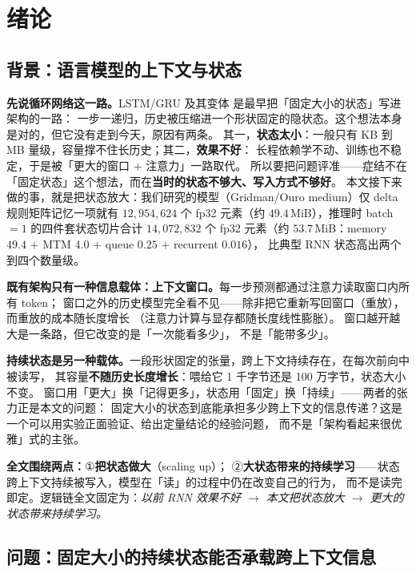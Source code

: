 \section{绪论}\label{sec:intro}

\subsection{背景：语言模型的上下文与状态}\label{sec:bg}

\textbf{先说循环网络这一路。}LSTM/GRU 及其变体\citep{hochreiter1997lstm,cho2014gru}
是最早把「固定大小的状态」写进架构的一路：
一步一递归，历史被压缩进一个形状固定的隐状态。这个想法本身是对的，但它没有走到今天，原因有两条。
其一，\textbf{状态太小}：一般只有 KB 到 MB 量级，容量撑不住长历史；其二，\textbf{效果不好}：
长程依赖学不动、训练也不稳定，于是被「更大的窗口 + 注意力」一路取代。
所以要把问题评准——症结不在「固定状态」这个想法，而在\textbf{当时的状态不够大、写入方式不够好}。
本文接下来做的事，就是把状态放大：我们研究的模型（Gridman/Ouro medium）仅 delta 规则矩阵记忆一项就有
$12{,}954{,}624$ 个 fp32 元素（约 $49.4$\,MiB），推理时 batch$=1$ 的四件套状态切片合计
$14{,}072{,}832$ 个 fp32 元素（约 $53.7$\,MiB：memory $49.4$ $+$ MTM $4.0$ $+$ queue $0.25$ $+$ recurrent $0.016$），
比典型 RNN 状态高出两个到四个数量级。

\textbf{既有架构只有一种信息载体：上下文窗口。}每一步预测都通过注意力读取窗口内所有 token；
窗口之外的历史模型完全看不见——除非把它重新写回窗口（重放），而重放的成本随长度增长
（注意力计算与显存都随长度线性膨胀）\citep{vaswani2017attention,dao2022flashattention,pope2023efficient}。
窗口越开越大是一条路\citep{beltagy2020longformer,ding2023longnet}，但它改变的是「一次能看多少」，
不是「能带多少」。

\textbf{持续状态是另一种载体。}一段形状固定的张量，跨上下文持续存在，在每次前向中被读写，
其容量\textbf{不随历史长度增长}：喂给它 1 千字节还是 100 万字节，状态大小不变。
窗口用「更大」换「记得更多」，状态用「固定」换「持续」——两者的张力正是本文的问题：
固定大小的状态到底能承担多少跨上下文的信息传递？这是一个可以用实验正面验证、给出定量结论的经验问题，
而不是「架构看起来很优雅」式的主张。

\textbf{全文围绕两点：}①\textbf{把状态做大}（scaling up）；
②\textbf{大状态带来的持续学习}——状态跨上下文持续被写入，模型在「读」的过程中仍在改变自己的行为，
而不是读完即定。逻辑链全文固定为：\emph{以前 RNN 效果不好 $\to$ 本文把状态放大 $\to$ 更大的状态带来持续学习。}

\subsection{问题：固定大小的持续状态能否承载跨上下文信息}\label{sec:problem}

